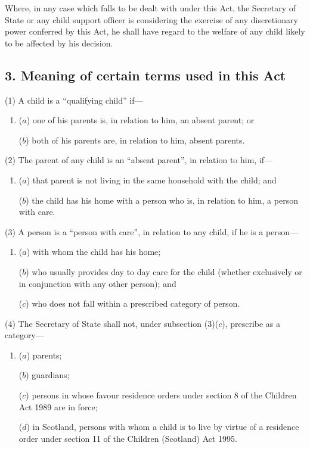 \documentclass[12pt,a4paper]{article}
\begin{document}
Where, in any case which falls to be dealt with under this Act, the Secretary of State 
or any child support officer  %
is considering the exercise of any discretionary power conferred by this Act, he shall have regard to the welfare of any child likely to be affected by his decision.


\subsection{3. Meaning of certain terms used in this Act}

(1) A child is a “qualifying child” if—
\begin{enumerate}\item[]
($a$) one of his parents is, in relation to him, an absent parent; or

($b$) both of his parents are, in relation to him, absent parents.
\end{enumerate}

(2) The parent of any child is an “absent parent”, in relation to him, if—
\begin{enumerate}\item[]
($a$) that parent is not living in the same household with the child; and

($b$) the child has his home with a person who is, in relation to him, a person with care.
\end{enumerate}

(3) A person is a “person with care”, in relation to any child, if he is a person—
\begin{enumerate}\item[]
($a$) with whom the child has his home;

($b$) who usually provides day to day care for the child (whether exclusively or in conjunction with any other person); and

($c$) who does not fall within a prescribed category of person.
\end{enumerate}

(4) The Secretary of State shall not, under subsection (3)($c$), prescribe as a category—
\begin{enumerate}\item[]
($a$) parents;

($b$) guardians;

($c$) persons in whose favour residence orders under section 8 of the Children Act 1989 are in force;

($d$) in Scotland, persons 
with whom a child is to live by virtue of a residence order under section 11 of the Children (Scotland) Act 1995.  %
\end{enumerate}
\end{document}
